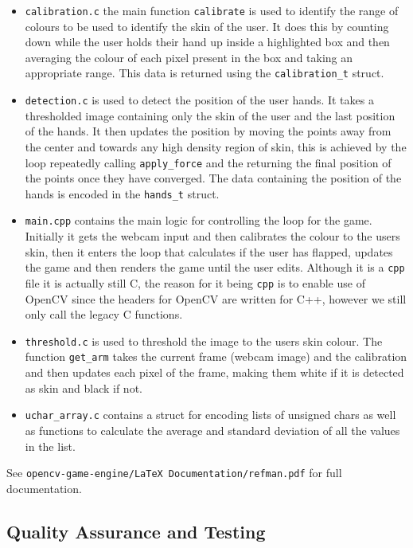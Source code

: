 \documentclass[10pt]{article}
\begin{document}
\begin{itemize}
\item \texttt{calibration.c} the main function \texttt{calibrate} is used to identify the range of colours to be used to identify the skin of the user. It does this by counting down while the user holds their hand up inside a highlighted box and then averaging the colour of each pixel present in the box and taking an appropriate range. This data is returned using the \texttt{calibration\_t} struct.
\item \texttt{detection.c} is used to detect the position of the user hands. It takes a thresholded image containing only the skin of the user and the last position of the hands. It then updates the position by moving the points away from the center and towards any high density region of skin, this is achieved by the loop repeatedly calling \texttt{apply\_force} and the returning the final position of the points once they have converged. The data containing the position of the hands is encoded in the \texttt{hands\_t} struct.
\item \texttt{main.cpp} contains the main logic for controlling the loop for the game. Initially it gets the webcam input and then calibrates the colour to the users skin, then it enters the loop that calculates if the user has flapped, updates the game and then renders the game until the user edits. Although it is a \texttt{cpp} file it is actually still C, the reason for it being \texttt{cpp} is to enable use of OpenCV since the headers for OpenCV are written for C++, however we still only call the legacy C functions.
\item \texttt{threshold.c} is used to threshold the image to the users skin colour. The function \texttt{get\_arm} takes the current frame (webcam image) and the calibration and then updates each pixel of the frame, making them white if it is detected as skin and black if not.
\item \texttt{uchar\_array.c} contains a struct for encoding lists of unsigned chars as well as functions to calculate the average and standard deviation of all the values in the list.
\end{itemize}

See \texttt{opencv-game-engine/LaTeX Documentation/refman.pdf} for full documentation.

\subsection{Quality Assurance and Testing}
\end{document}
